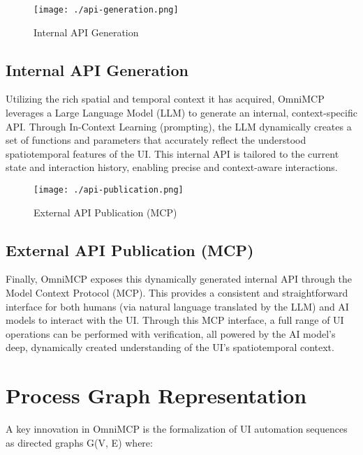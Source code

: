 \documentclass{article}
\begin{document}
\begin{figure}[h]
\centering
\texttt{[image: ./api-generation.png]}
\caption{Internal API Generation}
\label{fig:internal-api}
\end{figure}

\subsection{Internal API Generation}
Utilizing the rich spatial and temporal context it has acquired, OmniMCP leverages a Large Language Model (LLM) to generate an internal, context-specific API. Through In-Context Learning (prompting), the LLM dynamically creates a set of functions and parameters that accurately reflect the understood spatiotemporal features of the UI. This internal API is tailored to the current state and interaction history, enabling precise and context-aware interactions.

\begin{figure}[h]
\centering
\texttt{[image: ./api-publication.png]}
\caption{External API Publication (MCP)}
\label{fig:external-api}
\end{figure}

\subsection{External API Publication (MCP)}
Finally, OmniMCP exposes this dynamically generated internal API through the Model Context Protocol (MCP). This provides a consistent and straightforward interface for both humans (via natural language translated by the LLM) and AI models to interact with the UI. Through this MCP interface, a full range of UI operations can be performed with verification, all powered by the AI model's deep, dynamically created understanding of the UI's spatiotemporal context.

\section{Process Graph Representation}

A key innovation in OmniMCP is the formalization of UI automation sequences as directed graphs G(V, E) where:
\end{document}

